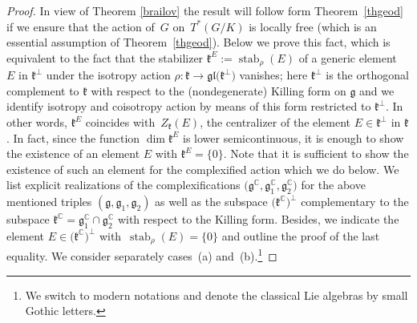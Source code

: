 \documentclass[pdftex]{sigma}
\numberwithin{equation}{section}
\begin{document}
\begin{proof} In view of Theorem \ref{brailov} the result will follow form Theorem~\ref{thgeod} if we ensure that the action of~$G$ on~$T^*(G/K)$ is locally free (which is an essential assumption of Theorem~\ref{thgeod}). Below we prove this fact, which is equivalent to the fact that the stabilizer $\mathfrak{k}^E:=\operatorname{stab}_\rho(E)$ of a generic element~$E$ in $\mathfrak{k}^{\perp}$ under the isotropy action $\rho\colon \mathfrak{k} \rightarrow \mathfrak{gl}\big(\mathfrak{k}^{\perp}\big)$ vanishes; here $\mathfrak{k}^{\perp}$ is the orthogonal complement to $\mathfrak{k}$ with respect to the (nondegenerate) Killing form on $\mathfrak{g}$ and we identify isotropy and coisotropy action by means of this form restricted to $\mathfrak{k}^\perp$. In other words, $\mathfrak{k}^E$ coincides with~$Z_\mathfrak{k}(E)$, the centralizer of the element $E\in\mathfrak{k}^{\perp}$ in $\mathfrak{k}$. In fact, since the function $\dim\mathfrak{k}^E$ is lower semicontinuous, it is enough to show the existence of an element $E$ with $\mathfrak{k}^E=\{0\}$. Note that it is sufficient to show the existence of such an element for the complexified action which we do below. We list explicit realizations of the complexifications $\big(\mathfrak{g}^\mathbb{C},\mathfrak{g}^\mathbb{C}_1,\mathfrak{g}^\mathbb{C}_2\big)$ for the above mentioned triples $(\mathfrak{g},\mathfrak{g}_1,\mathfrak{g}_2)$ as well as the subspace $\big(\mathfrak{k}^\mathbb{C}\big)^\perp$ complementary to the subspace $\mathfrak{k}^\mathbb{C}=\mathfrak{g}_1^\mathbb{C}\cap\mathfrak{g}_2^\mathbb{C}$ with respect to the Killing form. Besides, we indicate the element $E\in\big(\mathfrak{k}^\mathbb{C}\big)^{\perp}$ with~$\operatorname{stab}_\rho(E)=\{0\}$ and outline the proof of the last equality.
We consider separately cases~(a) and~(b).\footnote{We switch to modern notations and denote the classical Lie algebras by small Gothic letters.}


\end{proof}
\end{document}
